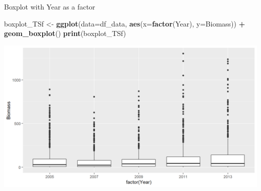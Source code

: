 \documentclass[
  ignorenonframetext,
]{beamer}
\newenvironment{Shaded}{\begin{snugshade}}{\end{snugshade}}
\newcommand{\DataTypeTok}[1]{\textcolor[rgb]{0.13,0.29,0.53}{#1}}
\newcommand{\KeywordTok}[1]{\textcolor[rgb]{0.13,0.29,0.53}{\textbf{#1}}}
\newcommand{\NormalTok}[1]{#1}
\newcommand{\OperatorTok}[1]{\textcolor[rgb]{0.81,0.36,0.00}{\textbf{#1}}}
\newcommand{\StringTok}[1]{\textcolor[rgb]{0.31,0.60,0.02}{#1}}
\begin{document}
\begin{frame}[fragile]{Boxplot with Year as a factor}
\protect\hypertarget{boxplot-with-year-as-a-factor}{}

\begin{Shaded}
\begin{Highlighting}[]
\NormalTok{boxplot_TSf <-}\StringTok{ }\KeywordTok{ggplot}\NormalTok{(}\DataTypeTok{data=}\NormalTok{df_data, }\KeywordTok{aes}\NormalTok{(}\DataTypeTok{x=}\KeywordTok{factor}\NormalTok{(Year), }\DataTypeTok{y=}\NormalTok{Biomass)) }\OperatorTok{+}\StringTok{ }
\StringTok{  }\KeywordTok{geom_boxplot}\NormalTok{() }
\KeywordTok{print}\NormalTok{(boxplot_TSf)}
\end{Highlighting}
\end{Shaded}

\begin{center}\includegraphics[width=0.8\linewidth]{figure/boxplot_TSf-1} \end{center}

\end{frame}
\end{document}
